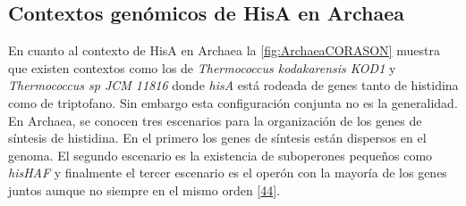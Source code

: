 \documentclass[12pt,twoside]{reedthesis}
\begin{document}
  \subsection{Contextos genómicos de HisA en
  Archaea}\label{contextos-genomicos-de-hisa-en-archaea}
  
  En cuanto al contexto de HisA en Archaea la \autoref{fig:ArchaeaCORASON}
  muestra que existen contextos como los de \emph{Thermococcus
  kodakarensis KOD1} y \emph{Thermococcus sp JCM 11816} donde \emph{hisA}
  está rodeada de genes tanto de histidina como de triptofano. Sin embargo
  esta configuración conjunta no es la generalidad. En Archaea, se conocen
  tres escenarios para la organización de los genes de síntesis de
  histidina. En el primero los genes de síntesis están dispersos en el
  genoma. El segundo escenario es la existencia de suboperones pequeños
  como \emph{hisHAF} y finalmente el tercer escenario es el operón con la
  mayoría de los genes juntos aunque no siempre en el mismo orden
  {[}\protect\hyperlink{ref-fondi_evolution_2009}{44}{]}.
  
\end{document}
